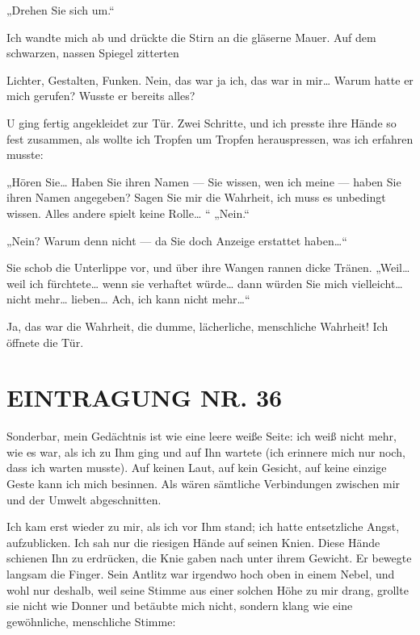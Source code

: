 „Drehen Sie sich um.“

Ich wandte mich ab und drückte die Stirn an die gläserne Mauer. Auf
dem schwarzen, nassen Spiegel zitterten

Lichter, Gestalten, Funken. Nein, das war ja ich, das war in mir\ldots{}
Warum hatte er mich gerufen? Wusste er bereits alles?

U ging fertig angekleidet zur Tür. Zwei Schritte, und ich presste
ihre Hände so fest zusammen, als wollte ich Tropfen um Tropfen
herauspressen, was ich erfahren musste:

„Hören Sie\ldots{} Haben Sie ihren Namen — Sie wissen, wen ich meine —
haben Sie ihren Namen angegeben? Sagen Sie mir die Wahrheit, ich
muss es unbedingt wissen. Alles andere spielt keine Rolle\ldots{} “
„Nein.“

„Nein? Warum denn nicht — da Sie doch Anzeige erstattet haben\ldots{}“

Sie schob die Unterlippe vor, und über ihre Wangen rannen dicke
Tränen. „Weil\ldots{} weil ich fürchtete\ldots{} wenn sie verhaftet würde\ldots{}
dann würden Sie mich vielleicht\ldots{} nicht mehr\ldots{} lieben\ldots{} Ach, ich
kann nicht mehr\ldots{}“

Ja, das war die Wahrheit, die dumme, lächerliche, menschliche
Wahrheit! Ich öffnete die Tür.

\section{EINTRAGUNG NR. 36}

Sonderbar, mein Gedächtnis ist wie eine leere weiße Seite: ich weiß
nicht mehr, wie es war, als ich zu Ihm ging und auf Ihn wartete
(ich erinnere mich nur noch, dass ich warten musste). Auf keinen
Laut, auf kein Gesicht, auf keine einzige Geste kann ich mich
besinnen. Als wären
sämtliche Verbindungen zwischen mir und der Umwelt abgeschnitten.

Ich kam erst wieder zu mir, als ich vor Ihm stand; ich hatte
entsetzliche Angst, aufzublicken. Ich sah nur die riesigen Hände
auf seinen Knien. Diese Hände schienen Ihn zu erdrücken, die Knie
gaben nach unter ihrem Gewicht. Er bewegte langsam die Finger. Sein
Antlitz war irgendwo hoch oben in einem Nebel, und wohl nur
deshalb, weil seine Stimme aus einer solchen Höhe zu mir drang,
grollte sie nicht wie Donner und betäubte mich nicht, sondern klang
wie eine gewöhnliche, menschliche Stimme:

